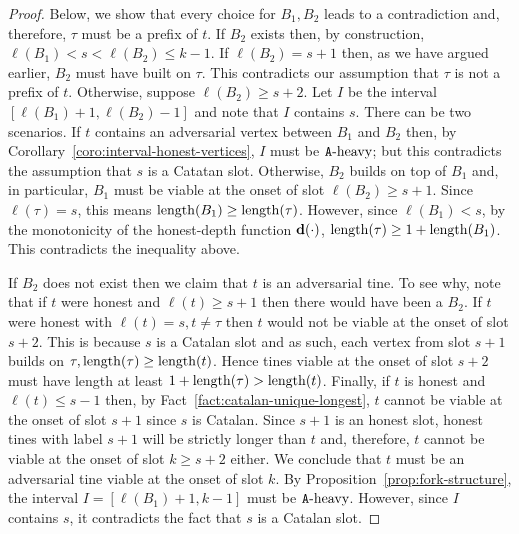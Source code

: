 \begin{proof}
    Below, we show that every choice for $B_1, B_2$ leads to a contradiction 
    and, therefore, $\tau$ must be a prefix of $t$. 
    If $B_2$ exists then, 
    by construction, $\ell(B_1) < s < \ell(B_2) \leq k - 1$.
    If $\ell(B_2) = s + 1$ then, as we have argued earlier, 
    $B_2$ must have built on $\tau$. 
    This contradicts our assumption that 
    $\tau$ is not a prefix of $t$. 
    Otherwise, suppose $\ell(B_2) \geq s + 2$.  
    Let $I$ be the interval $[\ell(B_1) + 1, \ell(B_2) - 1]$ and note that  
    $I$ contains $s$. 
    There can be two scenarios.
    If $t$ contains an adversarial vertex between $B_1$ and $B_2$ then,  
    by Corollary~\ref{coro:interval-honest-vertices}, 
    $I$ must be $\mathtt{A}\text{-heavy}$; but 
    this contradicts the assumption that $s$ is a Catatan slot. 
    Otherwise,
    $B_2$ builds on top of $B_1$ and, 
    in particular, 
    $B_1$ must be viable at the onset of slot $\ell(B_2) \geq s + 1$. 
    Since $\ell(\tau) = s$, this means $\operatorname{length}(B_1) \geq \operatorname{length}(\tau)$. 
    However, since $\ell(B_1) < s$, 
    by the monotonicity of the honest-depth function $\mathbf{d}(\cdot)$, 
    $\operatorname{length}(\tau) \geq 1 + \operatorname{length}(B_1)$. 
    This contradicts the inequality above.           

    If $B_2$ does not exist then 
    we claim that $t$ is an adversarial tine. 
    To see why, note that if $t$ were honest and $\ell(t) \geq s + 1$ 
    then there would have been a $B_2$. 
    If $t$ were honest with $\ell(t) = s, t \neq \tau$ 
    then $t$ would not be viable at the onset of slot $s + 2$. 
    This is because $s$ is a Catalan slot and as such, 
    each vertex from slot $s + 1$ builds on $\tau, \operatorname{length}(\tau) \geq \operatorname{length}(t)$. 
    Hence tines viable at the onset of slot $s + 2$ must have length at least $1 + \operatorname{length}(\tau) > \operatorname{length}(t)$. 
    Finally, if $t$ is honest and $\ell(t) \leq s - 1$ then, 
    by Fact~\ref{fact:catalan-unique-longest}, 
    $t$ cannot be viable at the onset of slot $s + 1$ 
    since $s$ is Catalan.  
    Since $s + 1$ is an honest slot, 
    honest tines with label $s + 1$ will be strictly longer than $t$ 
    and, therefore, 
    $t$ cannot be viable at the onset of slot $k \geq s + 2$ either. 
    We conclude that $t$ must be an adversarial tine viable at the onset of slot $k$. 
    By Proposition~\ref{prop:fork-structure},       
    the interval $I = [\ell(B_1) + 1, k - 1]$ must be $\mathtt{A}\text{-heavy}$. 
    However, since $I$ contains $s$, it contradicts the fact that $s$ is a Catalan slot.     
  \end{proof}


